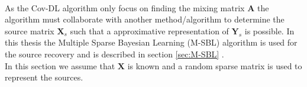 \\
As the Cov-DL algorithm only focus on finding the mixing matrix $\mathbf{A}$ the algorithm must collaborate with another method/algorithm to determine the source matrix $\mathbf{X}_s$ such that a approximative representation of $\mathbf{Y}_s$ is possible. In this thesis the Multiple Sparse Bayesian Learning (M-SBL) algorithm is used for the source recovery and is described in section \ref{sec:M-SBL} . 
\\
In this section we assume that $\mathbf{X}$ is known and a random sparse matrix is used to represent the sources. 



